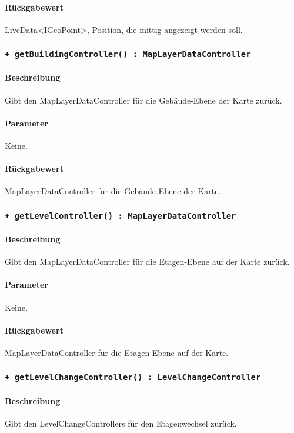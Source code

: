 \paragraph*{Rückgabewert}
LiveData<IGeoPoint>, Position, die mittig angezeigt werden soll.

\subsubsection{\texttt{+ getBuildingController() : MapLayerDataController}}%
\paragraph*{Beschreibung}
Gibt den MapLayerDataController für die Gebäude-Ebene der Karte zurück.
\paragraph*{Parameter}
Keine.
\paragraph*{Rückgabewert}
MapLayerDataController für die Gebäude-Ebene der Karte.

\subsubsection{\texttt{+ getLevelController() : MapLayerDataController}}%
\paragraph*{Beschreibung}
Gibt den MapLayerDataController für die Etagen-Ebene auf der Karte zurück.
\paragraph*{Parameter}
Keine.
\paragraph*{Rückgabewert}
MapLayerDataController für die Etagen-Ebene auf der Karte.

\subsubsection{\texttt{+ getLevelChangeController() : LevelChangeController}}%
\paragraph*{Beschreibung}
Gibt den LevelChangeControllers für den Etagenwechsel zurück.
